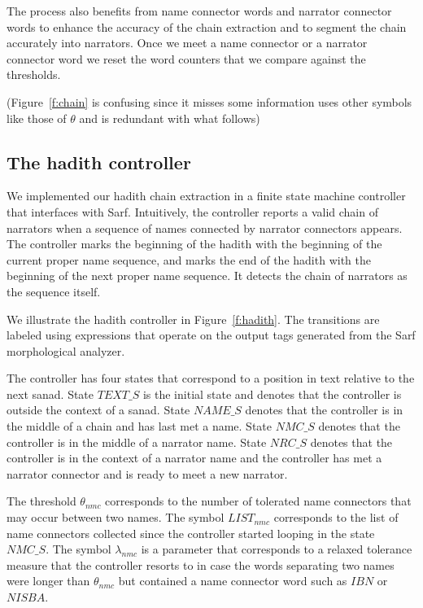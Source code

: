 \documentclass[11pt]{article}
\begin{document}
The process also benefits from name connector 
words and narrator connector words to enhance the
accuracy of the chain extraction and to segment the 
chain accurately into narrators.
Once we meet a name connector or a narrator 
connector word we reset the word counters that we
compare against the thresholds. 

(Figure~\ref{f:chain} is confusing since it misses some information uses other symbols like 
those of $\theta$ and is redundant with what follows)


\subsection{The hadith controller}
\label{sec:controller}

We implemented our hadith chain extraction 
in a finite state machine
controller that interfaces with Sarf.
Intuitively, the controller reports a valid chain 
of narrators when a sequence of names
connected by narrator connectors appears. 
The controller marks the beginning of the hadith with 
the beginning of 
the current proper name sequence,
and marks the end of the hadith with the beginning of the 
next proper name sequence. 
It detects the chain of narrators as the sequence itself. 

We illustrate the hadith controller 
in Figure~\ref{f:hadith}. 
The transitions are labeled using expressions
that operate on the output tags 
generated from the Sarf morphological analyzer.

The controller has four states that correspond to 
a position in text relative to the next sanad. 
State $\mathit{TEXT\_S}$ is the initial state and denotes 
that the controller is outside the context of a sanad.
State $\mathit{NAME\_S}$ denotes that the controller is in
the middle of a chain and has last met a name. 
State $\mathit{NMC\_S}$ denotes that the controller is in
the middle of a narrator name.
State $\mathit{NRC\_S}$ denotes that the controller is 
in the context of a narrator name and the controller 
has met a narrator connector and is ready to meet 
a new narrator. 

The threshold $\theta_{\mathit{nmc}}$ 
corresponds to the number of tolerated name connectors 
that may occur between two names. %
The symbol $\mathit{LIST}_{\mathit{nmc}}$ corresponds to the list 
of name connectors collected since the controller
started looping in the state $\mathit{NMC\_S}$.
The symbol $\lambda_{\mathit{nmc}}$ is a parameter 
that corresponds to a relaxed tolerance measure that
the controller resorts to in case the words separating
two names were longer than $\theta_{\mathit{nmc}}$ but 
contained a name connector word such as $\mathit{IBN}$ 
or $\mathit{NISBA}$.
\end{document}
